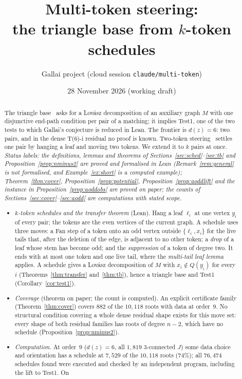 \documentclass[11pt]{amsart}
\title[Multi-token steering]{Multi-token steering:\\ the triangle base from $k$-token schedules}
\author{Gallai project (cloud session \texttt{claude/multi-token})}
\date{28 November 2026 (working draft)}
\theoremstyle{definition}
\begin{document}
\begin{abstract}
The triangle base~\cite{DT} asks for a Lov\'asz decomposition of an auxiliary graph $M$ with one
disjunctive end-path condition per pair of a matching; it implies Test1, one of the two tests to
which Gallai's conjecture is reduced in Lean. The frontier is $d(z)=6$: two pairs, and in the
dense T(6)-i residual no proof is known. Two-token steering~\cite{TRN} settles one pair by hanging a
leaf and moving two tokens. We extend it to $k$ pairs at once. \emph{Status labels: the definitions, lemmas and theorems of
Sections~\ref{sec:sched}--\ref{sec:tb} and Proposition~\ref{prop:nminus2} are proved and formalised in Lean
(Remark~\ref{rem:general} is not formalised, and Example~\ref{ex:short} is a computed example);
Theorem~\ref{thm:cover}, Proposition~\ref{prop:potential}, Proposition~\ref{prop:aoddlift} and the instance in
Proposition~\ref{prop:aoddobs} are proved on paper; the counts of Sections~\ref{sec:cover}--\ref{sec:aodd}
are computations with stated scope.}
\begin{itemize}
\item \emph{$k$-token schedules and the transfer theorem} (Lean). Hang a leaf $\ell_i$ at one vertex
$y_i$ of every pair; the tokens are the even vertices of the current graph. A schedule uses three
moves: a Fan step of a token onto an odd vertex outside $\{\ell_i,x_i\}$ for the live tails that,
after the deletion of the edge, is adjacent to no other token; a \emph{drop} of a leaf whose stem has become odd; and the \emph{suppression} of a token of
degree two. It ends with at most one token and one live tail, where the \emph{multi-tail leaf lemma}
applies. A schedule gives a Lov\'asz decomposition of $M$ with $x_i\notin Q(y_i)$ for every $i$
(Theorems~\ref{thm:transfer} and~\ref{thm:tb}), hence a triangle base and Test1
(Corollary~\ref{cor:test1}).
\item \emph{Coverage} (theorem on paper; the count is computed). An explicit certificate family
(Theorem~\ref{thm:cover}) covers $882$ of the $10{,}118$ roots with data at order~$9$. No structural
condition covering a whole dense residual shape exists for this move set: every shape of both residual
families has roots of degree $n-2$, which have no schedule (Proposition~\ref{prop:nminus2}).
\item \emph{Computation.} At order~$9$ ($d(z)=6$, all $1{,}819$ $3$-connected $J$) some data choice
and orientation has a schedule at $7{,}529$ of the $10{,}118$ roots ($74\%$); all $76{,}474$
schedules found were executed and checked by an independent program, including the lift to Test1. On

\end{itemize}
\end{abstract}
\end{document}

